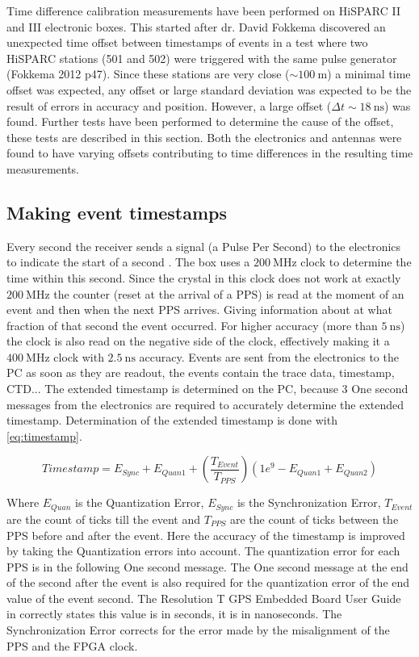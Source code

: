 Time difference calibration measurements have been performed on HiSPARC II and III electronic boxes. This started after dr. David Fokkema discovered an unexpected time offset between timestamps of events in a test where two HiSPARC stations (501 and 502) were triggered with the same pulse generator (Fokkema 2012 p47). Since these stations are very close ($\sim\SI{100}{\meter}$) a minimal time offset was expected, any offset or large standard deviation was expected to be the result of errors in \gps accuracy and position. However, a large offset ($\Delta t \sim\SI{18}{\ns}$) was found. Further tests have been performed to determine the cause of the offset, these tests are described in this section. Both the \hisparc electronics and \gps antennas were found to have varying offsets contributing to time differences in the resulting time measurements.


\subsection{Making event timestamps}
\label{sub:gps_timestamps}

Every second the \gps receiver sends a signal (a Pulse Per Second) to the \hisparc electronics to indicate the start of a second \cite{messages}. The \hisparc box uses a $\SI{200}{\mega\hertz}$ clock to determine the time within this second. Since the crystal in this clock does not work at exactly $\SI{200}{\mega\hertz}$ the counter (reset at the arrival of a PPS) is read at the moment of an event and then when the next PPS arrives. Giving information about at what fraction of that second the event occurred. For higher accuracy (more than $\SI{5}{\ns}$) the clock is also read on the negative side of the clock, effectively making it a $\SI{400}{\mega\hertz}$ clock with $\SI{2.5}{\ns}$ accuracy. Events are sent from the \hisparc electronics to the PC as soon as they are readout, the events contain the trace data, timestamp, CTD... The extended timestamp is determined on the PC, because 3 One second messages from the electronics are required to accurately determine the extended timestamp. Determination of the extended timestamp is done with \cref{eq:timestamp}.

\begin{equation}
\label{eq:timestamp}
    Timestamp = E_{Sync} + E_{Quan1} + \left(\frac{T_{Event}}{T_{PPS}}\right)
                 \left(1e^9 - E_{Quan1} + E_{Quan2}\right)
\end{equation}

Where $E_{Quan}$ is the Quantization Error, $E_{Sync}$ is the Synchronization Error, $T_{Event}$ are the count of ticks till the event and $T_{PPS}$ are the count of ticks between the PPS before and after the event. Here the accuracy of the timestamp is improved by taking the Quantization errors into account. The quantization error for each PPS is in the following One second message. The One second message at the end of the second after the event is also required for the quantization error of the end value of the event second. The Resolution T GPS Embedded Board User Guide in correctly states this value is in seconds, it is in nanoseconds. The Synchronization Error corrects for the error made by the misalignment of the PPS and the FPGA clock.

